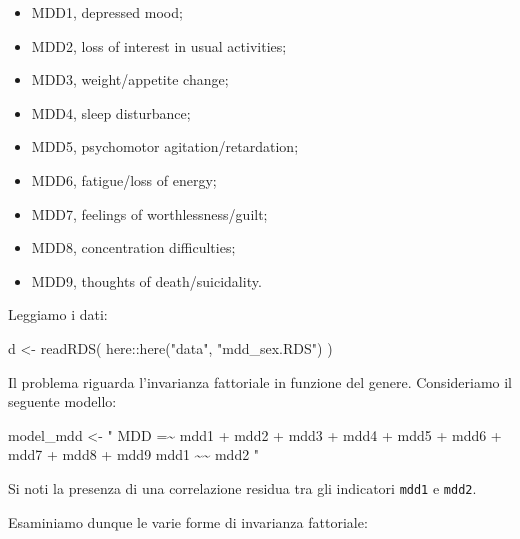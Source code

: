\documentclass[
  11pt,
]{krantz}
\makeatletter
\newenvironment{Shaded}{\begin{snugshade}}{\end{snugshade}}
\newcommand{\FunctionTok}[1]{\textcolor[rgb]{0,0,0}{#1}}
\newcommand{\NormalTok}[1]{#1}
\newcommand{\OtherTok}[1]{\textcolor[rgb]{0.37,0.37,0.37}{#1}}
\newcommand{\SpecialCharTok}[1]{\textcolor[rgb]{0,0,0}{#1}}
\newcommand{\StringTok}[1]{\textcolor[rgb]{0.5,0.5,0.5}{#1}}
\providecommand{\tightlist}{%
  \setlength{\itemsep}{0pt}\setlength{\parskip}{0pt}}
\newenvironment{kframe}{%
\medskip{}
\setlength{\fboxsep}{.8em}
 \def\at@end@of@kframe{}%
 \ifinner\ifhmode%
  \def\at@end@of@kframe{\end{minipage}}%
  \begin{minipage}{\columnwidth}%
 \fi\fi%
 \def\FrameCommand##1{\hskip\@totalleftmargin \hskip-\fboxsep
 \colorbox{shadecolor}{##1}\hskip-\fboxsep
     \hskip-\linewidth \hskip-\@totalleftmargin \hskip\columnwidth}%
 \MakeFramed {\advance\hsize-\width
   \@totalleftmargin\z@ \linewidth\hsize
   \@setminipage}}%
 {\par\unskip\endMakeFramed%
 \at@end@of@kframe}
\renewenvironment{Shaded}{\begin{kframe}}{\end{kframe}}
\theoremstyle{definition}
\theoremstyle{definition}
\theoremstyle{definition}
\theoremstyle{definition}
\theoremstyle{remark}
\makeatother
\begin{document}
\begin{itemize}
\tightlist
\item
  MDD1, depressed mood;
\item
  MDD2, loss of interest in usual activities;
\item
  MDD3, weight/appetite change;
\item
  MDD4, sleep disturbance;
\item
  MDD5, psychomotor agitation/retardation;
\item
  MDD6, fatigue/loss of energy;
\item
  MDD7, feelings of worthlessness/guilt;
\item
  MDD8, concentration difficulties;
\item
  MDD9, thoughts of death/suicidality.
\end{itemize}

Leggiamo i dati:

\begin{Shaded}
\begin{Highlighting}[]
\NormalTok{d }\OtherTok{\textless{}{-}} \FunctionTok{readRDS}\NormalTok{(}
\NormalTok{  here}\SpecialCharTok{::}\FunctionTok{here}\NormalTok{(}\StringTok{"data"}\NormalTok{, }\StringTok{"mdd\_sex.RDS"}\NormalTok{)}
\NormalTok{)}
\end{Highlighting}
\end{Shaded}

Il problema riguarda l'invarianza fattoriale in funzione del genere. Consideriamo il seguente modello:

\begin{Shaded}
\begin{Highlighting}[]
\NormalTok{model\_mdd }\OtherTok{\textless{}{-}} \StringTok{"}
\StringTok{  MDD =\textasciitilde{} mdd1 + mdd2 + mdd3 + mdd4 + mdd5 + mdd6 + mdd7 + mdd8 +}
\StringTok{         mdd9}
\StringTok{  mdd1 \textasciitilde{}\textasciitilde{} mdd2}
\StringTok{"}
\end{Highlighting}
\end{Shaded}

Si noti la presenza di una correlazione residua tra gli indicatori \texttt{mdd1} e \texttt{mdd2}.

Esaminiamo dunque le varie forme di invarianza fattoriale:
\end{document}
